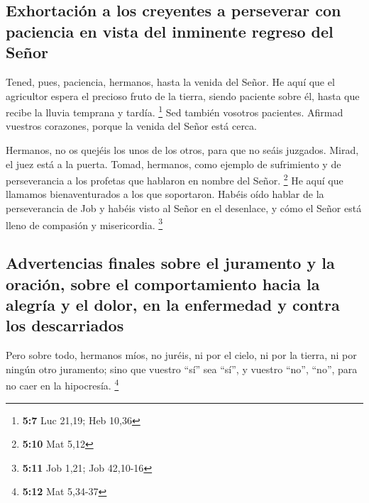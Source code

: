 \begin{paracol}{2}
\hypertarget{exhortaciuxf3n-a-los-creyentes-a-perseverar-con-paciencia-en-vista-del-inminente-regreso-del-seuxf1or}{%
\subsection{Exhortación a los creyentes a perseverar con paciencia en
vista del inminente regreso del
Señor}\label{exhortaciuxf3n-a-los-creyentes-a-perseverar-con-paciencia-en-vista-del-inminente-regreso-del-seuxf1or}}

 Tened, pues, paciencia, hermanos, hasta la venida del
Señor. He aquí que el agricultor espera el precioso fruto de la tierra,
siendo paciente sobre él, hasta que recibe la lluvia temprana y tardía.
\footnote{\textbf{5:7} Luc 21,19; Heb 10,36}  Sed también
vosotros pacientes. Afirmad vuestros corazones, porque la venida del
Señor está cerca.

 Hermanos, no os quejéis los unos de los otros, para que
no seáis juzgados. Mirad, el juez está a la puerta. 
Tomad, hermanos, como ejemplo de sufrimiento y de perseverancia a los
profetas que hablaron en nombre del Señor. \footnote{\textbf{5:10} Mat
  5,12}  He aquí que llamamos bienaventurados a los que
soportaron. Habéis oído hablar de la perseverancia de Job y habéis visto
al Señor en el desenlace, y cómo el Señor está lleno de compasión y
misericordia. \footnote{\textbf{5:11} Job 1,21; Job 42,10-16}

\hypertarget{advertencias-finales-sobre-el-juramento-y-la-oraciuxf3n-sobre-el-comportamiento-hacia-la-alegruxeda-y-el-dolor-en-la-enfermedad-y-contra-los-descarriados}{%
\subsection{Advertencias finales sobre el juramento y la oración, sobre
el comportamiento hacia la alegría y el dolor, en la enfermedad y contra
los
descarriados}\label{advertencias-finales-sobre-el-juramento-y-la-oraciuxf3n-sobre-el-comportamiento-hacia-la-alegruxeda-y-el-dolor-en-la-enfermedad-y-contra-los-descarriados}}

 Pero sobre todo, hermanos míos, no juréis, ni por el
cielo, ni por la tierra, ni por ningún otro juramento; sino que vuestro
``sí'' sea ``sí'', y vuestro ``no'', ``no'', para no caer en la
hipocresía. \footnote{\textbf{5:12} Mat 5,34-37}


\end{paracol}

